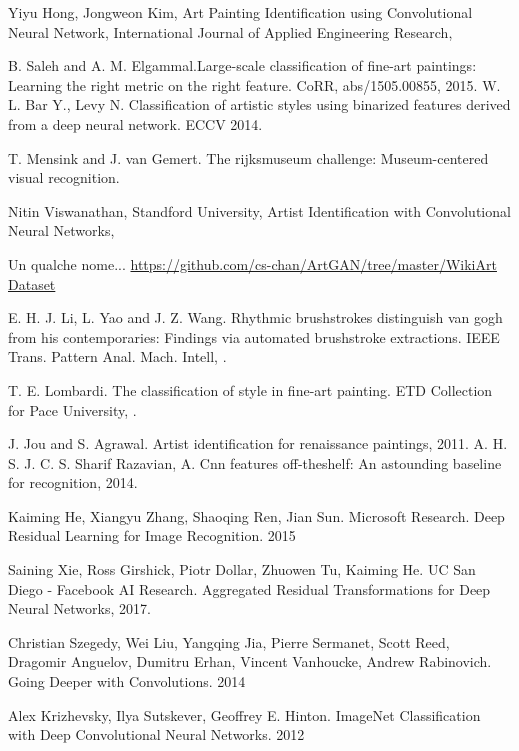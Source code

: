 \documentclass{article}
\begin{document}
\begin{thebibliography}{1}
	
	Yiyu Hong, Jongweon Kim, \newblock  Art Painting Identification using Convolutional Neural Network, \newblock International Journal of Applied Engineering Research, 
	
	B. Saleh and A. M. Elgammal.\newblock  Large-scale classification
	of fine-art paintings: Learning the right metric on the right
	feature. \newblock CoRR, abs/1505.00855, 2015.
	W. L. Bar Y., Levy N. Classification of artistic styles using binarized features derived from a deep neural network.
	ECCV 2014.
	
	T. Mensink and J. van Gemert. \newblock The rijksmuseum challenge:
	Museum-centered visual recognition. 
	
	
	Nitin Viswanathan, Standford University,
	\newblock Artist Identification with Convolutional Neural Networks, 
	
	Un qualche nome... \newblock
	\url{https://github.com/cs-chan/ArtGAN/tree/master/WikiArt Dataset}
	
	E. H. J. Li, L. Yao and J. Z. Wang. \newblock Rhythmic brushstrokes
	distinguish van gogh from his contemporaries: Findings via
	automated brushstroke extractions. IEEE Trans. Pattern
	Anal. Mach. Intell, .
		
	T. E. Lombardi. \newblock The classification of style in fine-art painting. ETD Collection for Pace University, .
	
	J. Jou and S. Agrawal. Artist identification for renaissance
	paintings, 2011.
	A. H. S. J. C. S. Sharif Razavian, A. Cnn features off-theshelf: An astounding baseline for recognition, 2014.
	
	Kaiming He, Xiangyu Zhang, Shaoqing Ren, Jian Sun. Microsoft Research. 
	Deep Residual Learning for Image Recognition. 2015
	
	Saining Xie, Ross Girshick, Piotr Dollar, Zhuowen Tu, Kaiming He. UC San Diego - Facebook AI Research. Aggregated Residual Transformations for Deep Neural Networks, 2017.
	
	Christian Szegedy, Wei Liu, Yangqing Jia, Pierre Sermanet, Scott Reed, Dragomir Anguelov, Dumitru Erhan, Vincent Vanhoucke, Andrew Rabinovich. Going Deeper with Convolutions. 2014
	
	Alex Krizhevsky, Ilya Sutskever, Geoffrey E. Hinton. ImageNet Classification with Deep Convolutional
	Neural Networks. 2012
	
	
	
	
\end{thebibliography}
\end{document}
